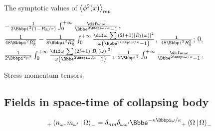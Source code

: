 \begin{ppty}
The symptotic values of ${\left<{\phi^2}\mathopen{}\left(x\right)\mathclose{}\right>}_\text{ren}$ \cite{PhysRevD.21.2185}

$-\frac{1}{2\pp^2\rbr{1-\rSch/r}}\int_0^{+\infty}\frac{\dif\omega\,\omega}{\ee^{2\pp\omega/\kappa}-1}$,
$\frac{1}{48\pp^2\rSch^2}-\frac{1}{8\pp^2\rSch^2}\int_0^{+\infty}\frac{\dif\omega\,\sum \rbr{2l+1}\vbr{\rfun{B_l}{\omega}}^2}{\omega\rbr{\ee^{2\pp\omega/\kappa}-1}}$,
$\frac{1}{48\pp^2\rSch^2}$;
$0$,
$\frac{1}{2\pp^2 r^2}\int_0^{+\infty}\frac{\dif\omega\,\sum \rbr{2l+1}\vbr{\rfun{B_l}{\omega}}^2}{\omega\rbr{\ee^{2\pp\omega/\kappa}-1}}$,
$\frac{1}{2\pp^2}\int_0^{+\infty}\frac{\dif\omega\,\omega}{\ee^{2\pp\omega/\kappa}-1}$.
\end{ppty}

Stress-momentum tensors
\cite{PhysRevD.15.2088,PhysRevD.21.2185}

\subsection{Fields in space-time of collapsing body}

\cite{HAWKING1974,Hawking1975}

\cite{PhysRevD.12.1519}
\begin{equation}
_+\Braket{n_{\omega}, m_{\omega'} | \Omega}_- =
\delta_{nm}\delta_{\omega\omega'}\ee^{-n\pp \omega/\kappa}{}
_+\Braket{\Omega|\Omega}_-
\end{equation}

